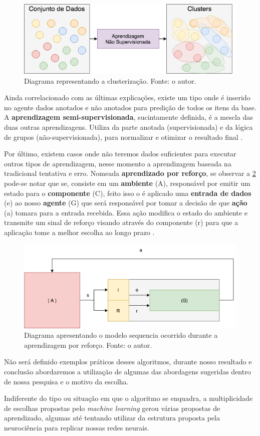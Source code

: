 \begin{figure}[H]
    \centering
    \includegraphics[width=.8\textwidth]{imagens/unsupervised.png}
    \caption{Diagrama representando a clusterização. Fonte: o autor.}
    \label{fig:unsupervised}
\end{figure}

Ainda correlacionado com as últimas explicações, existe um tipo onde é inserido no agente dados anotados e não anotados para predição de todos os itens da base. A \textbf{aprendizagem semi-supervisionada}, sucintamente definida, é a mescla das duas outras aprendizagens. Utiliza da parte anotada (supervisionada) e da lógica de grupos (não-supervisionada), para normalizar e otimizar o resultado final \cite[7]{mohri2012foundations}.

Por último, existem casos onde não teremos dados suficientes para executar outros tipos de aprendizagem, nesse momento a aprendizagem baseada na tradicional tentativa e erro. Nomeada \textbf{aprendizado por reforço}, se observar a \ref{fig:reinforcement} pode-se notar que se, consiste em um \textbf{ambiente} (A), responsável por emitir um estado para o \textbf{componente} (C), feito isso o é aplicado uma \textbf{entrada de dados} (e) ao nosso \textbf{agente} (G) que será responsável por tomar a decisão de que \textbf{ação} (a) tomara para a entrada recebida. Essa ação modifica o estado do ambiente e transmite um sinal de reforço visando através do componente (r) para que a aplicação tome a melhor escolha ao longo prazo \cite{kaelbling1996reinforcement, russell2003artificial}.

\begin{figure}[H]
    \centering
    \includegraphics[width=.8\textwidth]{imagens/reinforcement.png}
    \caption{Diagrama apresentando o modelo sequencia ocorrido durante a aprendizagem por reforço. Fonte: o autor.}
    \label{fig:reinforcement}
\end{figure}

Não será definido exemplos práticos desses algoritmos, durante nosso resultado e conclusão abordaremos a utilização de algumas das abordagens sugeridas dentro de nossa pesquisa e o motivo da escolha.

Indiferente do tipo ou situação em que o algoritmo se enquadra, a multiplicidade de escolhas propostas pelo \textit{machine learning} gerou várias propostas de aprendizado, algumas até tentando utilizar da estrutura proposta pela neurociência para replicar nossas redes neurais.
